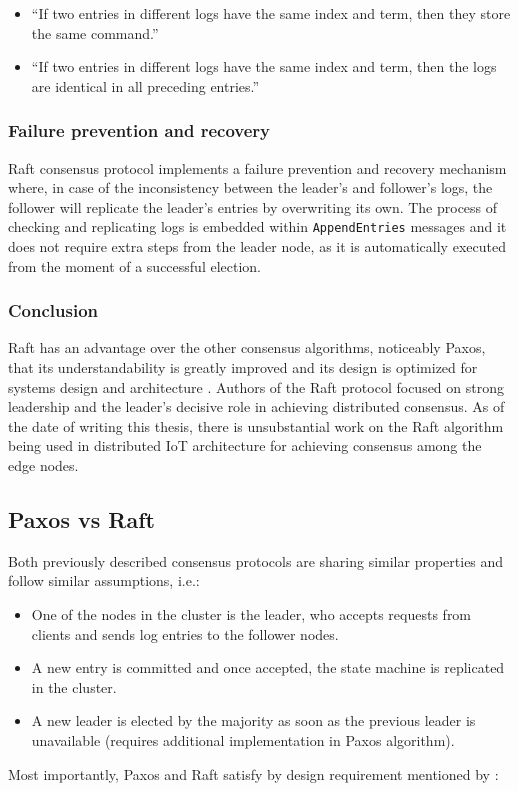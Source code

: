 \documentclass[oneside,12pt]{book}
\begin{document}
\begin{itemize}
  \item “If two entries in different logs have the same index and term, then they store the same command.”
  
  \item “If two entries in different logs have the same index and term, then the logs are identical in all preceding entries.”
\end{itemize}

\subsubsection{Failure prevention and recovery}
Raft consensus protocol implements a failure prevention and recovery mechanism where, in case of the inconsistency between the leader’s and follower’s logs, the follower will replicate the leader’s entries by overwriting its own. The process of checking and replicating logs is embedded within \texttt{AppendEntries} messages and it does not require extra steps from the leader node, as it is automatically executed from the moment of a successful election.

\subsubsection{Conclusion}
Raft has an advantage over the other consensus algorithms, noticeably Paxos, that its understandability is greatly improved \citep{UCAM-CL-TR-857} and its design is optimized for systems design and architecture \citep{10.5555/2643634.2643666}. Authors of the Raft protocol focused on strong leadership and the leader’s decisive role in achieving distributed consensus. As of the date of writing this thesis, there is unsubstantial work on the Raft algorithm being used in distributed IoT architecture for achieving consensus among the edge nodes.

\subsection{Paxos vs Raft}
Both previously described consensus protocols are sharing similar properties and follow similar assumptions, i.e.:

\begin{itemize}
  \item One of the nodes in the cluster is the leader, who accepts requests from clients and sends log entries to the follower nodes.
  
  \item A new entry is committed and once accepted, the state machine is replicated in the cluster.
  
   \item A new leader is elected by the majority as soon as the previous leader is unavailable (requires additional implementation in Paxos algorithm).
\end{itemize}
Most importantly, Paxos and Raft satisfy by design requirement mentioned by \cite{10.1145/3380787.3393681}:
\end{document}
